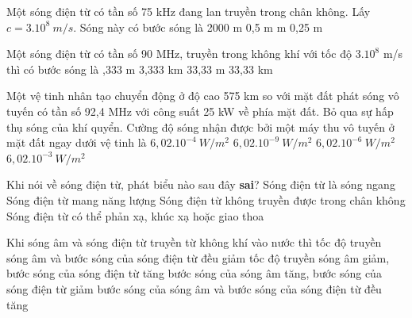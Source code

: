 









\setcounter{paragraph}{0}
\setcounter{ex}{0} 
\PhanI
\begin{ex} %
 Một sóng điện từ có tần số 75 kHz đang lan truyền trong chân không. Lấy $c=3.10^8\ m/s$. Sóng này có bước sóng là
\choice
{2000 m} 
{0,5 m} 
{ m}
{0,25 m}
\end{ex} 

\begin{ex} %
 Một sóng điện từ có tần số 90 MHz, truyền trong không khí với tốc độ ${3.10^8}$ m/s thì có bước sóng là
\choice
{,333 m}
{3,333 km}
{33,33 m}
{33,33 km}
\end{ex} 


\begin{ex}%
Một vệ tinh nhân tạo chuyển động ở độ cao 575 km so với mặt đất phát sóng vô tuyến có tần số 92,4 MHz với công suất 25 kW về phía mặt đất. Bỏ qua sự hấp thụ sóng của khí quyển. Cường độ sóng nhận được bởi một máy thu vô tuyến ở mặt đất ngay dưới vệ tinh là
\choice
{$6,02.10^{-4}\ W/m^2$}
{\True $6,02.10^{-9}\ W/m^2$}
{$6,02.10^{-6}\ W/m^2$}
{$6,02.10^{-3}\ W/m^2$}
\end{ex} 
\begin{ex} %
 Khi nói về sóng điện từ, phát biểu nào sau đây \textbf{sai}?
\choice
{Sóng điện từ là sóng ngang}
{Sóng điện từ mang năng lượng}
{\True Sóng điện từ không truyền được trong chân không}
{Sóng điện từ có thể phản xạ, khúc xạ hoặc giao thoa}
\end{ex} 
\begin{ex} %
Khi sóng âm và sóng điện từ truyền từ không khí vào nước thì
\choice
{tốc độ truyền sóng âm và bước sóng của sóng điện từ đều giảm}
{tốc độ truyền sóng âm giảm, bước sóng của sóng điện từ tăng}
{\True bước sóng của sóng âm tăng, bước sóng của sóng điện từ giảm}
{bước sóng của sóng âm và bước sóng của sóng điện từ đều tăng}
\end{ex} 


